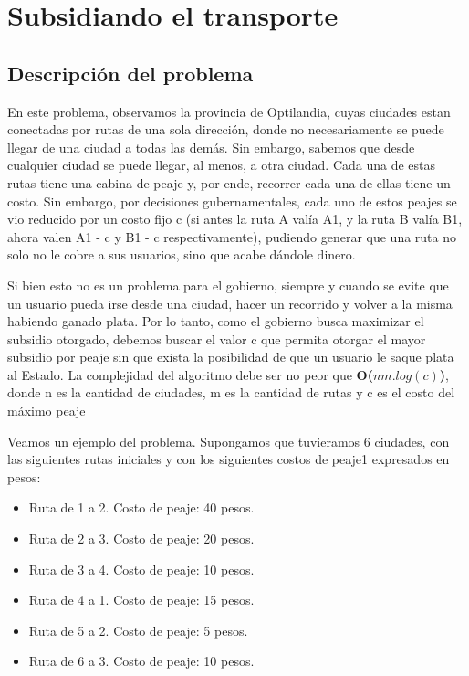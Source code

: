 \section{Subsidiando el transporte}

\subsection{Descripción del problema}
En este problema, observamos la provincia de Optilandia, cuyas ciudades estan conectadas por rutas de una sola dirección, donde no necesariamente se puede llegar de una ciudad a todas las demás. Sin embargo, sabemos que desde cualquier ciudad se puede llegar, al menos, a otra ciudad. Cada una de estas rutas tiene una cabina de peaje y, por ende, recorrer cada una de ellas tiene un costo. Sin embargo, por decisiones gubernamentales, cada uno de estos peajes se vio reducido por un costo fijo c (si antes la ruta A valía A1, y la ruta B valía B1, ahora valen A1 - c y B1 - c respectivamente), pudiendo generar que una ruta no solo no le cobre a sus usuarios, sino que acabe dándole dinero.
\\
\par
Si bien esto no es un problema para el gobierno, siempre y cuando se evite que un usuario pueda irse desde una ciudad, hacer un recorrido y volver a la misma habiendo ganado plata. Por lo tanto, como el gobierno busca maximizar el subsidio otorgado, debemos buscar el valor c que permita otorgar el mayor subsidio por peaje sin que exista la posibilidad de que un usuario le saque plata al Estado. La complejidad del algoritmo debe ser no peor que \textbf{O($nm.log(c)$)}, donde n es la cantidad de ciudades, m es la cantidad de rutas y c es el costo del máximo peaje
\\
\par
Veamos un ejemplo del problema. Supongamos que tuvieramos 6 ciudades, con las siguientes rutas iniciales y con los siguientes costos de peaje1 expresados en pesos:
\begin{itemize}
\item Ruta de 1 a 2. Costo de peaje: 40 pesos.
\item Ruta de 2 a 3. Costo de peaje: 20 pesos.
\item Ruta de 3 a 4. Costo de peaje: 10 pesos.
\item Ruta de 4 a 1. Costo de peaje: 15 pesos.
\item Ruta de 5 a 2. Costo de peaje: 5 pesos.
\item Ruta de 6 a 3. Costo de peaje: 10 pesos.
\end{itemize}
